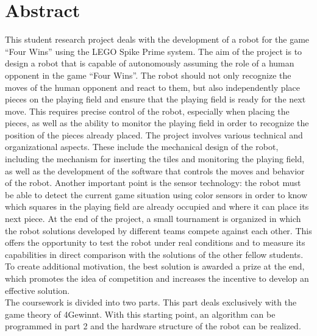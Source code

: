 \chapter*{Abstract} %
\label{cha:Abstract}
This student research project deals with the development of a robot for the game “Four Wins” using the LEGO Spike Prime system. The aim of the project is to design a robot that is capable of autonomously assuming the role of a human opponent in the game “Four Wins”. The robot should not only recognize the moves of the human opponent and react to them, but also independently place pieces on the playing field and ensure that the playing field is ready for the next move. This requires precise control of the robot, especially when placing the pieces, as well as the ability to monitor the playing field in order to recognize the position of the pieces already placed.
The project involves various technical and organizational aspects. These include the mechanical design of the robot, including the mechanism for inserting the tiles and monitoring the playing field, as well as the development of the software that controls the moves and behavior of the robot. Another important point is the sensor technology: the robot must be able to detect the current game situation using color sensors in order to know which squares in the playing field are already occupied and where it can place its next piece. At the end of the project, a small tournament is organized in which the robot solutions developed by different teams compete against each other. This offers the opportunity to test the robot under real conditions and to measure its capabilities in direct comparison with the solutions of the other fellow students. To create additional motivation, the best solution is awarded a prize at the end, which promotes the idea of competition and increases the incentive to develop an effective solution. \\
The coursework is divided into two parts. This part deals exclusively with the game theory of 4Gewinnt. With this starting point, an algorithm can be programmed in part 2 and the hardware structure of the robot can be realized.

\clearpage